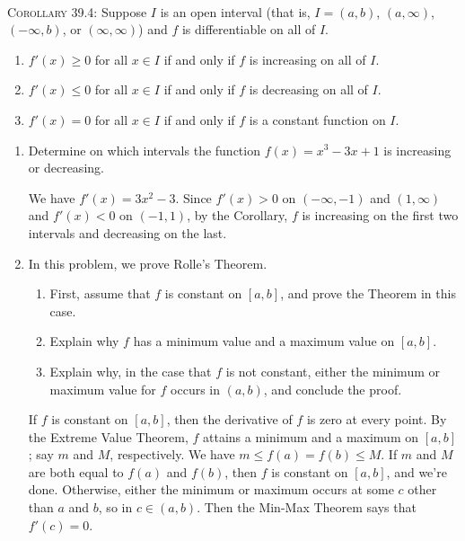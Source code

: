 \documentclass[12pt]{amsart}
\numberwithin{equation}{section}
\theoremstyle{plain} %
\theoremstyle{definition}
\theoremstyle{remark}
\begin{document}
\begin{framed}
\


 \noindent \textsc{Corollary 39.4:} Suppose $I$ is an open interval (that is, $I = (a,b)$, $(a, \infty)$, $(-\infty, b)$, or $(\infty, \infty)$) and $f$ is differentiable on all of $I$.  
\begin{enumerate}
\item $f'(x) \geq 0$ for all $x \in I$ if and only if $f$ is increasing on all of $I$.
\item $f'(x) \leq 0$ for all $x \in I$ if and only if $f$ is decreasing on all of $I$.
\item $f'(x) = 0$ for all $x \in I$ if and only if $f$ is a constant function on $I$. 
\end{enumerate}

 
  \end{framed}
\begin{enumerate}


\item Determine on which intervals the function $f(x)=x^3-3x+1$ is increasing or decreasing.

\begin{framed}
We have $f'(x)=3x^2-3$. Since $f'(x)>0$ on $(-\infty,-1)$ and $(1,\infty)$ and $f'(x)<0$ on $(-1,1)$, by the Corollary, $f$ is increasing on the first two intervals and decreasing on the last.
\end{framed}
 

\item In this problem, we prove Rolle's Theorem. \begin{enumerate}
\item First, assume that $f$ is constant on $[a,b]$, and prove the Theorem in this case.
\item Explain why $f$ has a minimum value and a maximum value on $[a,b]$.
\item Explain why, in the case that $f$ is not constant, either the minimum or maximum value for $f$ occurs in $(a,b)$, and conclude the proof.
\end{enumerate}

\begin{framed}
If $f$ is constant on $[a,b]$, then the derivative of $f$ is zero at every point. By the Extreme Value Theorem, $f$ attains a minimum and a maximum on $[a,b]$; say $m$ and $M$, respectively. We have $m \leq f(a) = f(b) \leq M$. If $m$ and $M$ are both equal to $f(a)$ and $f(b)$, then $f$ is constant on $[a,b]$, and we're done. Otherwise, either the minimum or maximum occurs at some $c$  other than $a$ and $b$, so in $c\in (a,b)$. Then the Min-Max Theorem says that $f'(c)=0$.
\end{framed}




\end{enumerate}
\end{document}
